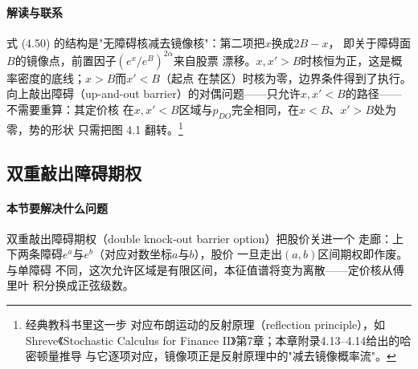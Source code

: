 \paragraph{解读与联系}
式 (4.50) 的结构是"无障碍核减去镜像核"：第二项把$x$换成$2B-x$，
即关于障碍面$B$的镜像点，前置因子$(e^{x}/e^{B})^{2\alpha}$来自股票
漂移。$x,x'>B$时核恒为正，这是概率密度的底线；$x>B$而$x'<B$（起点
在禁区）时核为零，边界条件得到了执行。向上敲出障碍（up-and-out
barrier）的对偶问题——只允许$x,x'<B$的路径——不需要重算：其定价核
在$x,x'<B$区域与$p_{DO}$完全相同，在$x<B$、$x'>B$处为零，势的形状
只需把图 4.1 翻转。\footnote{经典教科书里这一步
对应布朗运动的反射原理（reflection principle），如Shreve《Stochastic
Calculus for Finance II》第7章；本章附录4.13--4.14给出的哈密顿量推导
与它逐项对应，镜像项正是反射原理中的"减去镜像概率流"。}

\subsection{双重敲出障碍期权}

\paragraph{本节要解决什么问题}
双重敲出障碍期权（double knock-out barrier option）把股价关进一个
走廊：上下两条障碍$e^{a}$与$e^{b}$（对应对数坐标$a$与$b$），股价
一旦走出$(a,b)$区间期权即作废。与单障碍
不同，这次允许区域是有限区间，本征值谱将变为离散——定价核从傅里叶
积分换成正弦级数。


